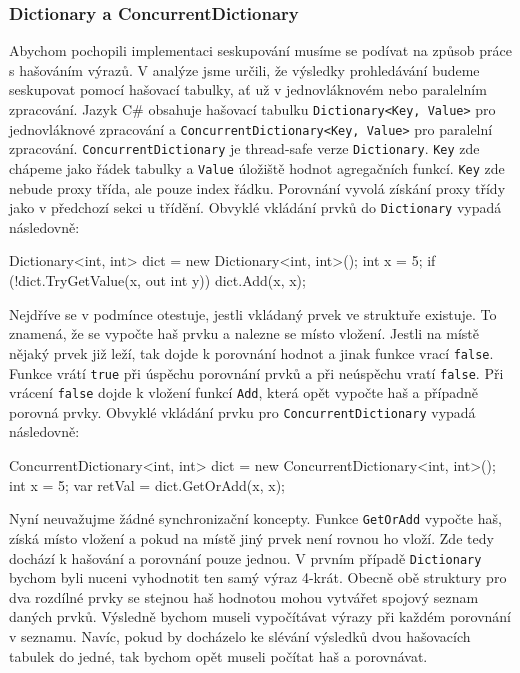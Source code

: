 \subsubsection{Dictionary a ConcurrentDictionary}

Abychom pochopili implementaci seskupování musíme se podívat na způsob práce s hašováním výrazů.
V analýze jsme určili, že výsledky prohledávání budeme seskupovat pomocí hašovací tabulky, ať už v jednovláknovém nebo paralelním zpracování.
Jazyk C\# obsahuje hašovací tabulku \texttt{Dictionary<Key, Value>} pro jednovláknové zpracování a \texttt{ConcurrentDictionary<Key, Value>} pro paralelní zpracování.
\texttt{ConcurrentDictionary} je thread-safe verze \texttt{Dictionary}. 
\texttt{Key} zde chápeme jako řádek tabulky a \texttt{Value} úložiště hodnot agregačních funkcí. 
\texttt{Key} zde nebude proxy třída, ale pouze index řádku.
Porovnání vyvolá získání proxy třídy jako v předchozí sekci u třídění.
Obvyklé vkládání prvků do \texttt{Dictionary} vypadá následovně:
\begin{code}
Dictionary<int, int> dict = new Dictionary<int, int>();
int x = 5;
if (!dict.TryGetValue(x, out int y)) dict.Add(x, x);
\end{code}
Nejdříve se v podmínce otestuje, jestli vkládaný prvek ve struktuře existuje.
To znamená, že se vypočte haš prvku a nalezne se místo vložení.
Jestli na místě nějaký prvek již leží, tak dojde k porovnání hodnot a jinak funkce vrací \texttt{false}.
Funkce vrátí \texttt{true} při úspěchu porovnání prvků a při neúspěchu vratí \texttt{false}.
Při vrácení \texttt{false} dojde k vložení funkcí \texttt{Add}, která opět vypočte haš a případně porovná prvky.
Obvyklé vkládání prvku pro \texttt{ConcurrentDictionary} vypadá následovně:
\begin{code}
ConcurrentDictionary<int, int> dict = 
    new ConcurrentDictionary<int, int>();
int x = 5;
var retVal = dict.GetOrAdd(x, x);
\end{code}
Nyní neuvažujme žádné synchronizační koncepty.
Funkce \texttt{GetOrAdd} vypočte haš, získá místo vložení a pokud na místě jiný prvek není rovnou ho vloží.
Zde tedy dochází k hašování a porovnání pouze jednou.
V prvním případě \texttt{Dictionary} bychom byli nuceni vyhodnotit ten samý výraz 4-krát.
Obecně obě struktury pro dva rozdílné prvky se stejnou haš hodnotou mohou vytvářet spojový seznam daných prvků.
Výsledně bychom museli vypočítávat výrazy při každém porovnání v seznamu.
Navíc, pokud by docházelo ke slévání výsledků dvou hašovacích tabulek do jedné, tak bychom opět museli počítat haš a porovnávat.
